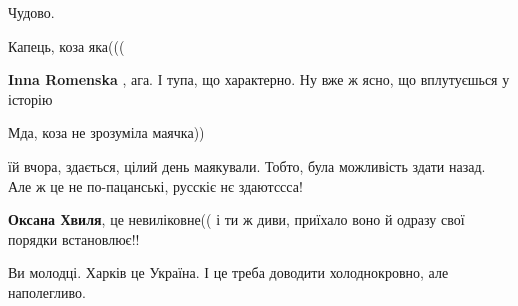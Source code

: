 \begin{itemize}
Чудово.

 
Капець, коза яка(((

\begin{itemize}
 
\textbf{Inna Romenska} , ага. І тупа, що характерно. Ну вже ж ясно, що вплутуєшься у історію

 
Мда, коза не зрозуміла маячка))

 
їй вчора, здається, цілий день маякували. Тобто, була можливість здати назад.
Але ж це не по-пацанські, русскіє нє здаютссса!

 
\textbf{Оксана Хвиля}, це невиліковне(( і ти ж диви, приїхало воно й одразу свої порядки встановлює!!

 

Ви молодці. Харків це Україна. І це треба доводити холоднокровно, але наполегливо.


\end{itemize}
\end{itemize}
